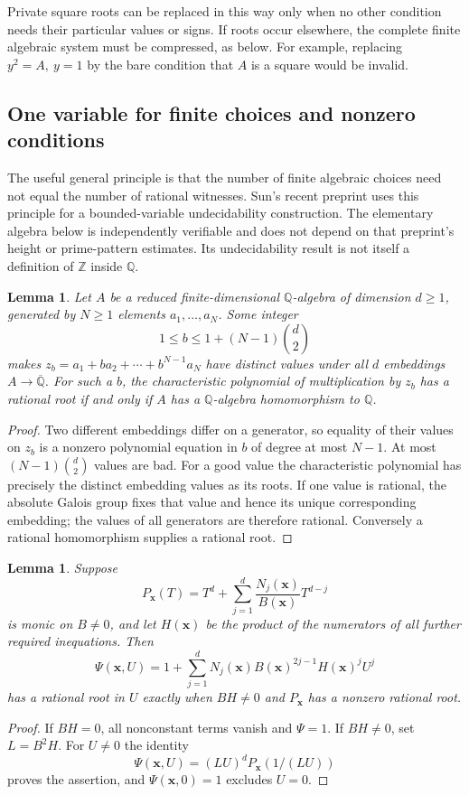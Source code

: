 \documentclass[11pt]{article}
\newtheorem{lemma}[theorem]{Lemma}
\theoremstyle{definition}
\begin{document}
Private square roots can be replaced in this way only when no other
condition needs their particular values or signs. If roots occur elsewhere,
the complete finite algebraic system must be compressed, as below.
For example, replacing $y^2=A,\ y=1$ by the bare condition that $A$
is a square would be invalid.

\subsection{One variable for finite choices and nonzero conditions}

The useful general principle is that the number of finite algebraic
choices need not equal the number of rational witnesses. Sun's recent
preprint \cite[Sections 10.3--10.6]{Sun2026Rational86} uses this principle
for a bounded-variable undecidability construction. The elementary
algebra below is independently verifiable and does not depend on that
preprint's height or prime-pattern estimates. Its undecidability result
is not itself a definition of $\mathbb Z$ inside $\mathbb Q$.

\begin{lemma}\label{lem:finite-separation}
Let $A$ be a reduced finite-dimensional $\mathbb Q$-algebra of dimension
$d\ge1$, generated by $N\ge1$ elements $a_1,\ldots,a_N$. Some integer
\[
 1\le b\le1+(N-1)\binom d2
\]
makes $z_b=a_1+ba_2+\cdots+b^{N-1}a_N$ have distinct values under all
$d$ embeddings $A\to\overline{\mathbb Q}$. For such a $b$, the
characteristic polynomial of multiplication by $z_b$ has a rational root
if and only if $A$ has a $\mathbb Q$-algebra homomorphism to $\mathbb Q$.
\end{lemma}
\begin{proof}
Two different embeddings differ on a generator, so equality of their
values on $z_b$ is a nonzero polynomial equation in $b$ of degree at most
$N-1$. At most $(N-1)\binom d2$ values are bad. For a good value the
characteristic polynomial has precisely the distinct embedding values
as its roots. If one value is rational, the absolute Galois group fixes
that value and hence its unique corresponding embedding; the values
of all generators are therefore rational. Conversely a rational
homomorphism supplies a rational root.
\end{proof}

\begin{lemma}\label{lem:reciprocal-guard}
Suppose
\[
 P_{\mathbf x}(T)=T^d+\sum_{j=1}^d
 \frac{N_j(\mathbf x)}{B(\mathbf x)}T^{d-j}
\]
is monic on $B\ne0$, and let $H(\mathbf x)$ be the product of the
numerators of all further required inequations. Then
\[
 \Psi(\mathbf x,U)=1+\sum_{j=1}^d
 N_j(\mathbf x)B(\mathbf x)^{2j-1}H(\mathbf x)^jU^j
\]
has a rational root in $U$ exactly when $BH\ne0$ and $P_{\mathbf x}$
has a nonzero rational root.
\end{lemma}
\begin{proof}
If $BH=0$, all nonconstant terms vanish and $\Psi=1$.
If $BH\ne0$, set $L=B^2H$. For $U\ne0$ the identity
\[
 \Psi(\mathbf x,U)=(LU)^dP_{\mathbf x}(1/(LU))
\]
proves the assertion, and $\Psi(\mathbf x,0)=1$ excludes $U=0$.
\end{proof}
\end{document}
